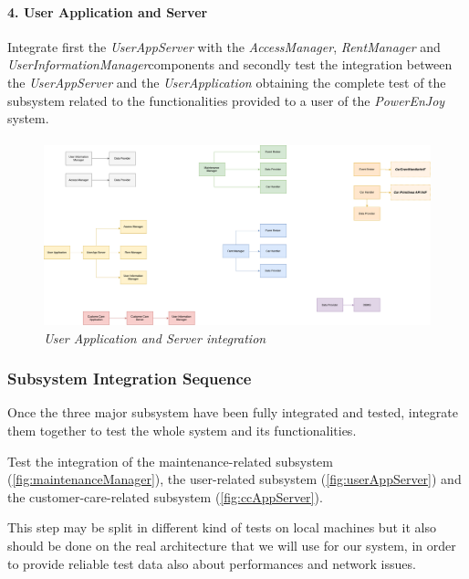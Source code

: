 \clearpage
\paragraph{4. User Application and Server} 
Integrate first the \emph{UserAppServer} with the \emph{AccessManager}, \emph{RentManager} and \emph{UserInformationManager}components and secondly test the integration between the \emph{UserAppServer} and the \emph{UserApplication} obtaining the complete test of the subsystem related to the functionalities provided to a user of the \emph{PowerEnJoy} system.
\paragraph{}
		
		\begin{figure}[h]
			\centering
			\includegraphics[width=0.7\linewidth]{img/Integration4}
			\caption{
				\label{fig:userAppServer} 
				\emph{User Application and Server integration}
			}
		\end{figure}
		

\clearpage 

\subsubsection{Subsystem Integration Sequence}
Once the three major subsystem have been fully integrated and tested, integrate them together to test the whole system and its functionalities.

Test the integration of the maintenance-related subsystem (\autoref{fig:maintenanceManager}), the user-related subsystem (\autoref{fig:userAppServer}) and the customer-care-related subsystem (\autoref{fig:ccAppServer}).

This step may be split in different kind of tests on local machines but it also should be done on the real architecture that we will use for our system, in order to provide reliable test data also about performances and network issues. \\

